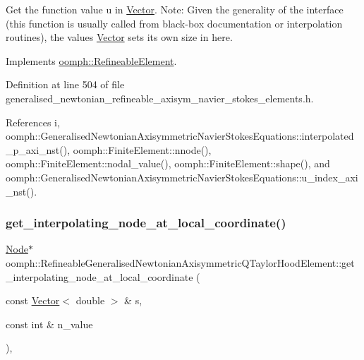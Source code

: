 Get the function value u in \hyperlink{classoomph_1_1Vector}{Vector}. Note\+: Given the generality of the interface (this function is usually called from black-\/box documentation or interpolation routines), the values \hyperlink{classoomph_1_1Vector}{Vector} sets its own size in here. 



Implements \hyperlink{classoomph_1_1RefineableElement_ada6f0efe831ffefb1d2829ce01d45bfc}{oomph\+::\+Refineable\+Element}.



Definition at line 504 of file generalised\+\_\+newtonian\+\_\+refineable\+\_\+axisym\+\_\+navier\+\_\+stokes\+\_\+elements.\+h.



References i, oomph\+::\+Generalised\+Newtonian\+Axisymmetric\+Navier\+Stokes\+Equations\+::interpolated\+\_\+p\+\_\+axi\+\_\+nst(), oomph\+::\+Finite\+Element\+::nnode(), oomph\+::\+Finite\+Element\+::nodal\+\_\+value(), oomph\+::\+Finite\+Element\+::shape(), and oomph\+::\+Generalised\+Newtonian\+Axisymmetric\+Navier\+Stokes\+Equations\+::u\+\_\+index\+\_\+axi\+\_\+nst().

\mbox{\label{classoomph_1_1RefineableGeneralisedNewtonianAxisymmetricQTaylorHoodElement_ab219c5f46716ac3ea6582580f4398f93}} 
\subsubsection{\texorpdfstring{get\+\_\+interpolating\+\_\+node\+\_\+at\+\_\+local\+\_\+coordinate()}{get\_interpolating\_node\_at\_local\_coordinate()}}
{\footnotesize\ttfamily \hyperlink{classoomph_1_1Node}{Node}$\ast$ oomph\+::\+Refineable\+Generalised\+Newtonian\+Axisymmetric\+Q\+Taylor\+Hood\+Element\+::get\+\_\+interpolating\+\_\+node\+\_\+at\+\_\+local\+\_\+coordinate (\begin{DoxyParamCaption}\item[{const \hyperlink{classoomph_1_1Vector}{Vector}$<$ double $>$ \&}]{s,  }\item[{const int \&}]{n\+\_\+value }\end{DoxyParamCaption})\hspace{0.3cm}{\ttfamily [inline]}, {\ttfamily [virtual]}}




